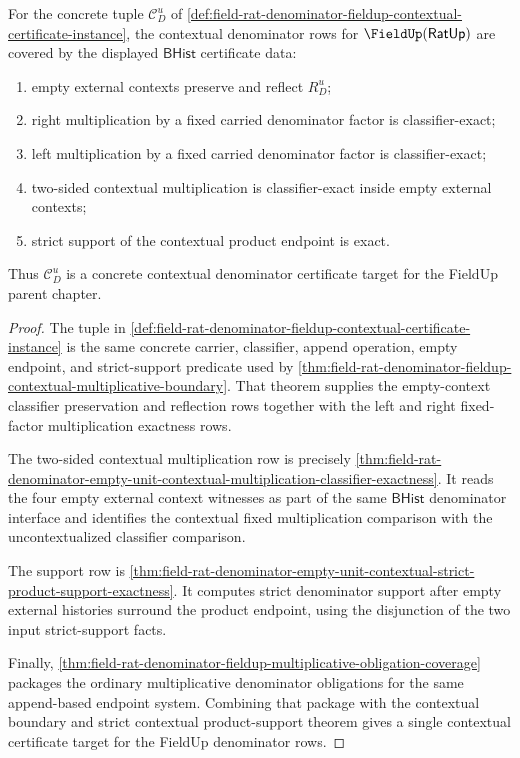 \begin{theorem}
\label{thm:field-rat-denominator-fieldup-contextual-obligation-coverage}
For the concrete tuple $\mathcal{C}_D^u$ of
\autoref{def:field-rat-denominator-fieldup-contextual-certificate-instance},
the contextual denominator rows for $\FieldUp(\mathsf{RatUp})$ are covered by
the displayed $\mathsf{BHist}$ certificate data:
\begin{enumerate}
  \item empty external contexts preserve and reflect $R_D^u$;
  \item right multiplication by a fixed carried denominator factor is
  classifier-exact;
  \item left multiplication by a fixed carried denominator factor is
  classifier-exact;
  \item two-sided contextual multiplication is classifier-exact inside empty
  external contexts;
  \item strict support of the contextual product endpoint is exact.
\end{enumerate}
Thus $\mathcal{C}_D^u$ is a concrete contextual denominator certificate target
for the FieldUp parent chapter.
\end{theorem}
\begin{proof}
The tuple in
\autoref{def:field-rat-denominator-fieldup-contextual-certificate-instance} is
the same concrete carrier, classifier, append operation, empty endpoint, and
strict-support predicate used by
\autoref{thm:field-rat-denominator-fieldup-contextual-multiplicative-boundary}.
That theorem supplies the empty-context classifier preservation and reflection
rows together with the left and right fixed-factor multiplication exactness
rows.

The two-sided contextual multiplication row is precisely
\autoref{thm:field-rat-denominator-empty-unit-contextual-multiplication-classifier-exactness}.
It reads the four empty external context witnesses as part of the same
$\mathsf{BHist}$ denominator interface and identifies the contextual fixed
multiplication comparison with the uncontextualized classifier comparison.

The support row is
\autoref{thm:field-rat-denominator-empty-unit-contextual-strict-product-support-exactness}.
It computes strict denominator support after empty external histories surround
the product endpoint, using the disjunction of the two input strict-support
facts.

Finally,
\autoref{thm:field-rat-denominator-fieldup-multiplicative-obligation-coverage}
packages the ordinary multiplicative denominator obligations for the same
append-based endpoint system. Combining that package with the contextual
boundary and strict contextual product-support theorem gives a single
contextual certificate target for the FieldUp denominator rows.
\end{proof}

